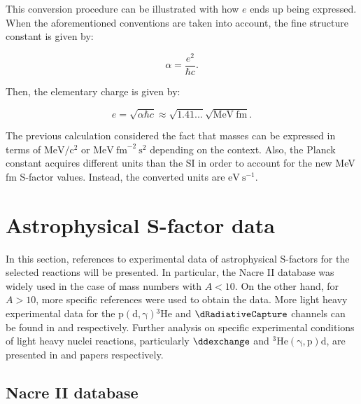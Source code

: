 \documentclass[openany]{book}
\begin{document}
This conversion procedure can be illustrated with how $e$ ends up being expressed. When the aforementioned conventions are taken into account, the fine structure constant is given by: 

\begin{equation} \label{eq:constants_alpha}
	\alpha = \frac{e^2}{\hbar c}.
\end{equation}

Then, the elementary charge is given by: 

\begin{equation} \label{eq:constants_e}
	e = \sqrt{\alpha\hbar c} \approx \sqrt{1.41...} \sqrt{\mathrm{MeV \ fm}}.
\end{equation}

The previous calculation considered the fact that masses can be expressed in terms of $\mathrm{MeV/c^2}$ or $\mathrm{MeV \ {fm}^{-2} \ s^{2}}$ depending on the context.  Also, the Planck constant acquires different units than the SI in order to account for the new MeV fm S-factor values. Instead, the converted units are $\mathrm{eV \ {s}^{-1}}$. 


\section{Astrophysical S-factor data} \label{sec:sfactorData}

In this section, references to experimental data of astrophysical S-factors for the selected reactions will be presented. In particular, the Nacre II database was widely used in the case of mass numbers with $A < 10$. On the other hand, for $A > 10$, more specific references were used to obtain the data. More light heavy experimental data for the $\mathrm{p(d,\gamma){}^{3}He}$ and  $\dRadiativeCapture$  channels can be found in \cite{bystritsky_gerasimov_krylov_parzhitskii_dudkin_kaminskii_nechaev_padalko_petrov_mesyats_et_2008} and  \cite{schmid_chasteler_laymon_weller_prior_tilley_1995} respectively. Further analysis on specific experimental conditions of light heavy nuclei reactions, particularly $\ddexchange$ and  $\mathrm{{}^{3}He(\gamma, p)d}$, are presented in \cite{berman_koester_smith_1964} and \cite{warren_erdman_robertson_axen_macdonald_1963} papers respectively.

\subsection{Nacre II database} \label{sub:nacreII}
\end{document}

